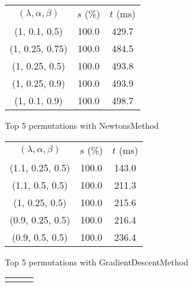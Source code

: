 \begin{figure}[H]
\label{fig:param_comp_MatrixSquareSum_ArmijoSearch}
\begin{subfigure}[ht]{.5\textwidth}
\begin{tabular}{|c|c|c|}
\hline
\rowcolor{gray!25}
\multicolumn{3}{|c|}{NewtonsMethod} \\
\hline
\rowcolor{gray!25}
$(\lambda,\alpha,\beta)$ & $s$ (\%) & $t$ (ms) \\
\hline
(1, 0.1, 0.5) & 100.0 & 429.7 \\
(1, 0.25, 0.75) & 100.0 & 484.5 \\
(1, 0.25, 0.5) & 100.0 & 493.8 \\
(1, 0.25, 0.9) & 100.0 & 493.9 \\
(1, 0.1, 0.9) & 100.0 & 498.7 \\
\hline
\end{tabular}
\caption{Top 5 permutations with NewtonsMethod}
\label{subfig:param_comp_MatrixSquareSum_NewtonsMethod_ArmijoSearch}
\end{subfigure}
\hfill
\begin{subfigure}[ht]{.5\textwidth}
\begin{tabular}{|c|c|c|}
\hline
\rowcolor{gray!25}
\multicolumn{3}{|c|}{GradientDescentMethod} \\
\hline
\rowcolor{gray!25}
$(\lambda,\alpha,\beta)$ & $s$ (\%) & $t$ (ms) \\
\hline
(1.1, 0.25, 0.5) & 100.0 & 143.0 \\
(1.1, 0.5, 0.5) & 100.0 & 211.3 \\
(1, 0.25, 0.5) & 100.0 & 215.6 \\
(0.9, 0.25, 0.5) & 100.0 & 216.4 \\
(0.9, 0.5, 0.5) & 100.0 & 236.4 \\
\hline
\end{tabular}
\caption{Top 5 permutations with GradientDescentMethod}
\label{subfig:param_comp_MatrixSquareSum_GradientDescentMethod_ArmijoSearch}
\end{subfigure}
\hfill
\begin{subfigure}[ht]{.5\textwidth}
\begin{tabular}{|c|c|c|}
\hline
\rowcolor{gray!25}
\multicolumn{3}{|c|}{ConjugateGradientMethod} \\

\end{tabular}
\end{subfigure}
\end{figure}
